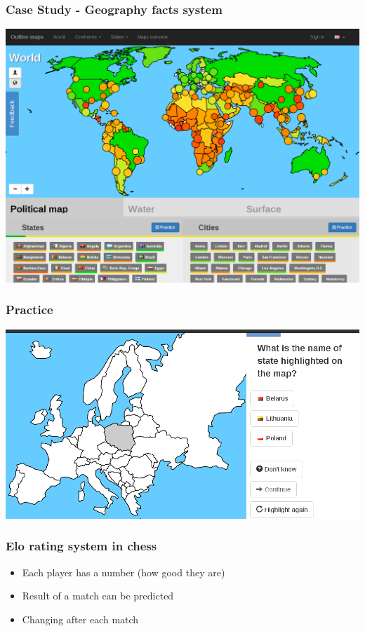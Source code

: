 \documentclass[xcolor=svgnames]{beamer}
\begin{document}
\begin{frame}
	\frametitle{Case Study - Geography facts system}
   \includegraphics[width=\textwidth]{img/knowledge-map-world-en.png}
\end{frame}
\begin{frame}
	\frametitle{Practice}
   \includegraphics[width=\textwidth]{img/practice-example-en.png}
\end{frame}
\begin{frame}
	\frametitle{Elo rating system in chess}
	\begin{itemize}
	  \item Each player has a number (how good they are)
	  \item Result of a match can be predicted 
	  \item Changing after each match
    \
	\end{itemize}
\end{frame}
\end{document}
